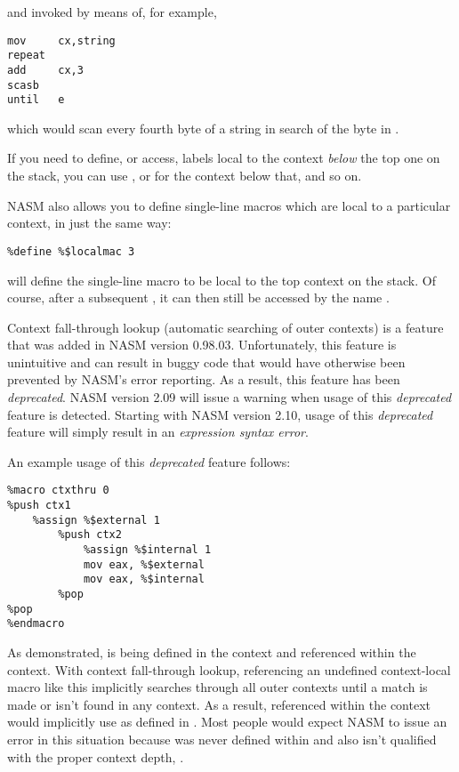 and invoked by means of, for example,

\begin{lstlisting}
mov     cx,string
repeat
add     cx,3
scasb
until   e
\end{lstlisting}

which would scan every fourth byte of a string in search of the byte
in .

If you need to define, or access, labels local to the context
\emph{below} the top one on the stack, you can use
\indexcode{\%\$\$}, or  for
the context below that, and so on.


NASM also allows you to define single-line macros which are local to
a particular context, in just the same way:

\begin{lstlisting}
%define %$localmac 3
\end{lstlisting}

will define the single-line macro  to be local to the
top context on the stack. Of course, after a subsequent ,
it can then still be accessed by the name .


Context fall-through lookup (automatic searching of outer contexts)
is a feature that was added in NASM version 0.98.03. Unfortunately,
this feature is unintuitive and can result in buggy code that would
have otherwise been prevented by NASM's error reporting. As a result,
this feature has been \emph{deprecated}. NASM version 2.09 will issue a
warning when usage of this \emph{deprecated} feature is detected. Starting
with NASM version 2.10, usage of this \emph{deprecated} feature will simply
result in an \emph{expression syntax error}.

An example usage of this \emph{deprecated} feature follows:

\begin{lstlisting}
%macro ctxthru 0
%push ctx1
    %assign %$external 1
        %push ctx2
            %assign %$internal 1
            mov eax, %$external
            mov eax, %$internal
        %pop
%pop
%endmacro
\end{lstlisting}

As demonstrated,  is being defined in the 
context and referenced within the  context. With context
fall-through lookup, referencing an undefined context-local macro
like this implicitly searches through all outer contexts until a match
is made or isn't found in any context. As a result, 
referenced within the  context would implicitly use 
as defined in . Most people would expect NASM to issue an error in
this situation because  was never defined within 
and also isn't qualified with the proper context depth, .

